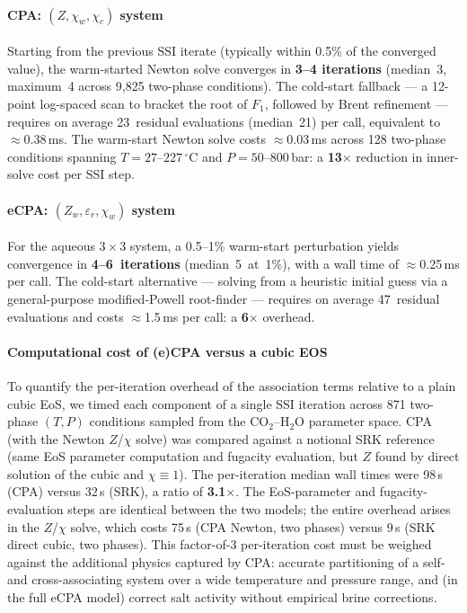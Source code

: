 \documentclass[preprint,12pt,authoryear]{elsarticle}
\begin{document}
\paragraph{CPA: $(Z, \chi_w, \chi_c)$ system}
Starting from the previous SSI iterate (typically within 0.5\% of the converged
value), the warm-started Newton solve converges in \textbf{3--4 iterations}
(median~3, maximum~4 across 9{,}825 two-phase conditions).
The cold-start fallback — a 12-point log-spaced scan to bracket the root of $F_1$,
followed by Brent refinement — requires on average 23~residual evaluations
(median~21) per call, equivalent to $\approx$0.38\,ms.
The warm-start Newton solve costs $\approx$0.03\,ms across 128 two-phase conditions
spanning $T = 27$--$227\,^\circ$C and $P = 50$--$800$\,bar:
a \textbf{13$\times$} reduction in inner-solve cost per SSI step.

\paragraph{eCPA: $(Z_w, \varepsilon_r, \chi_w)$ system}
For the aqueous $3\times 3$ system, a 0.5--1\% warm-start perturbation yields
convergence in \textbf{4--6~iterations} (median~5~at~1\%), with a wall time of
$\approx$0.25\,ms per call.
The cold-start alternative — solving from a heuristic initial guess via a
general-purpose modified-Powell root-finder — requires on average 47~residual
evaluations and costs $\approx$1.5\,ms per call: a \textbf{6$\times$} overhead.

\paragraph{Computational cost of (e)CPA versus a cubic EOS}
To quantify the per-iteration overhead of the association terms relative to a plain
cubic EoS, we timed each component of a single SSI iteration across 871 two-phase
$(T, P)$ conditions sampled from the CO$_2$--H$_2$O parameter space.
CPA (with the Newton $Z$/$\chi$ solve) was compared against a notional SRK reference
(same EoS parameter computation and fugacity evaluation, but $Z$ found by direct
solution of the cubic and $\chi \equiv 1$).
The per-iteration median wall times were 98\,\textmu{}s (CPA) versus 32\,\textmu{}s
(SRK), a ratio of \textbf{3.1$\times$}.
The EoS-parameter and fugacity-evaluation steps are identical between the two models;
the entire overhead arises in the $Z$/$\chi$ solve, which costs 75\,\textmu{}s
(CPA Newton, two phases) versus 9\,\textmu{}s (SRK direct cubic, two phases).
This factor-of-3 per-iteration cost must be weighed against the additional physics
captured by CPA: accurate partitioning of a self- and cross-associating system over
a wide temperature and pressure range, and (in the full eCPA model) correct salt
activity without empirical brine corrections.
\end{document}
